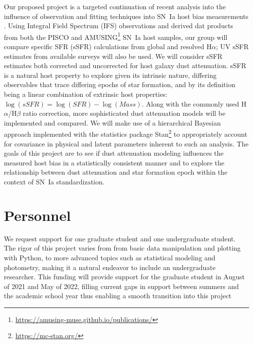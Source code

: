 \documentclass[modern]{aastex63}
\begin{document}
Our proposed project is a targeted continuation of recent analysis into the influence of observation and fitting techniques into SN~Ia host bias measurements \citep{Hand2021}.
Using Integral Field Spectrum (IFS) observations and derived dat products from both the PISCO \citep{Galbany2018} and AMUSING\footnote{\url{https://amusing-muse.github.io/publications/}} SN~Ia host samples, our group will compare specific SFR (sSFR) calculations from global and resolved H$\alpha$; UV sSFR estimates from available surveys will also be used.
We will consider sSFR estimates both corrected and uncorrected for host galaxy dust attenuation.
sSFR is a natural host property to explore given its intrinsic nature, differing observables that trace differing epochs of star formation, and by its definition being a linear combination of extrinsic host properties: $\log(sSFR) = \log(SFR) - \log(Mass)$.
Along with the commonly used H$\alpha$/H$\beta$ ratio correction, more sophisticated dust attenuation models will be implemented and compared\citep{Salim2018,Narayanan2018}.  
We will make use of a hierarchical Bayesian approach implemented with the statistics package Stan\footnote{\url{https://mc-stan.org/}} to appropriately account for covariance in physical and latent parameters inherent to such an analysis.
The goals of this project are to see if dust attenuation modeling influences the measured host bias in a statistically consistent manner and to explore the relationship between dust attenuation and star formation epoch within the context of SN~Ia standardization.
\section{Personnel}
We request support for one graduate student and one undergraduate student.
The rigor of this project varies from from basic data manipulation and plotting with Python, to more advanced topics such as statistical modeling and photometry, making it a natural endeavor to include an undergraduate researcher.
This funding will provide support for the graduate student in August of 2021 and May of 2022, filling current gaps in support between summers and the academic school year thus enabling a smooth transition into this project





\end{document}
